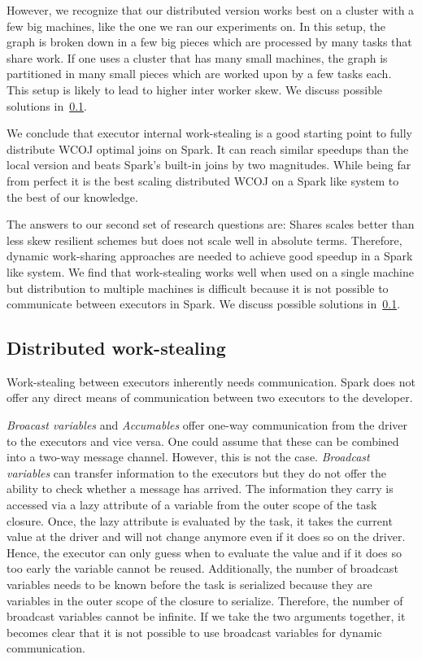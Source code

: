 However, we recognize that our distributed version works best on a cluster with a few
big machines, like the one we ran our experiments on.
In this setup, the graph is broken down in a few big pieces which are processed by
many tasks that share work.
If one uses a cluster that has many small machines, the graph is partitioned in many small pieces
which are worked upon by a few tasks each.
This setup is likely to lead to higher inter worker skew.
We discuss possible solutions in~\cref{subsubsec:cluster-mode}.

We conclude that executor internal work-stealing is a good starting point to fully distribute
\textsc{WCOJ} optimal joins on Spark.
It can reach similar speedups than the local version and beats Spark's built-in joins
by two magnitudes.
While being far from perfect it is the best scaling distributed \textsc{WCOJ} on a Spark
like system to the best of our knowledge.

The answers to our second set of research questions are: Shares scales better than less skew resilient schemes but
does not scale well in absolute terms.
Therefore, dynamic work-sharing approaches are needed to achieve good speedup in a Spark like system.
We find that work-stealing works well when used on a single machine but distribution to multiple
machines is difficult because it is not possible to communicate between executors in Spark.
We discuss possible solutions in~\cref{subsubsec:cluster-mode}.

\subsection{Distributed work-stealing} \label{subsubsec:cluster-mode}

Work-stealing between executors inherently needs communication.
Spark does not offer any direct means of communication between two executors to the developer.

\textit{Broacast variables} and \textit{Accumables} offer one-way communication from the driver to the executors and vice versa.
One could assume that these can be combined into a two-way message channel.
However, this is not the case.
\textit{Broadcast variables} can transfer information to the executors but they do not offer the ability to check whether a message has
arrived.
The information they carry is accessed via a lazy attribute of a variable from the outer scope of the task closure.
Once, the lazy attribute is evaluated by the task, it takes the current value at the driver and will not change anymore even if
it does so on the driver.
Hence, the executor can only guess when to evaluate the value and if it does so too early the variable cannot be reused.
Additionally, the number of broadcast variables needs to be known before the task is serialized because they are variables in the outer
scope of the closure to serialize.
Therefore, the number of broadcast variables cannot be infinite.
If we take the two arguments together, it becomes clear that it is not possible to use broadcast variables for dynamic communication.

